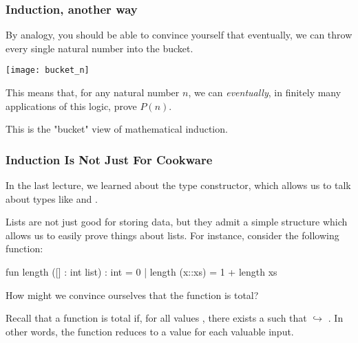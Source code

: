 \documentclass[aspectratio=169, handout]{beamer}
\begin{document}
\begin{frame}[fragile]
  \frametitle{Induction, another way}

  By analogy, you should be able to convince yourself that eventually, we can throw every single
  natural number into the bucket.

  \pause
  \begin{center} \texttt{[image: bucket\_n]} \end{center}

  This means that, for any natural number $n$, we can \textit{eventually}, in finitely many
  applications of this logic, prove $P(n)$.

  \pause
  \vspace{\fill}

  This is the "bucket" view of mathematical induction.
\end{frame}

\begin{frame}[fragile]
  \frametitle{Induction Is Not Just For Cookware}

  In the last lecture, we learned about the  type constructor, which allows us
  to talk about types like  and .

  \pause
  \vspace{\fill}

  Lists are not just good for storing data, but they admit a simple structure which allows
  us to easily prove things about lists. For instance, consider the following function:

  \pause
  \begin{codeblock}
    fun length ([] : int list) : int = 0
      | length (x::xs) = 1 + length xs
  \end{codeblock}

  How might we convince ourselves that the  function is total?

  \pause
  \vspace{\fill}

  Recall that a function  is total if, for all values , there exists a
   such that  $\hookrightarrow$ . In other words, the function
  reduces to a value for each valuable input.
\end{frame}
\end{document}
